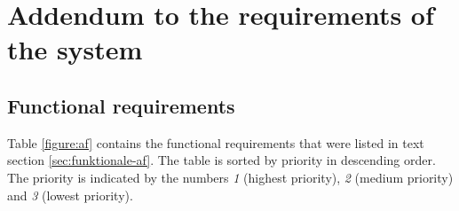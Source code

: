 \section{Addendum to the requirements of the system}

\subsection{Functional requirements}
\label{subsec:af-tabelle}

Table \ref{figure:af} contains the functional requirements that were listed in text section \ref{sec:funktionale-af}. The table is sorted by priority in descending order. The priority is indicated by the numbers \textit{1} (highest priority), \textit{2} (medium priority) and \textit{3} (lowest priority).

\clearpage
\setlength{\hoffset}{-7mm}



